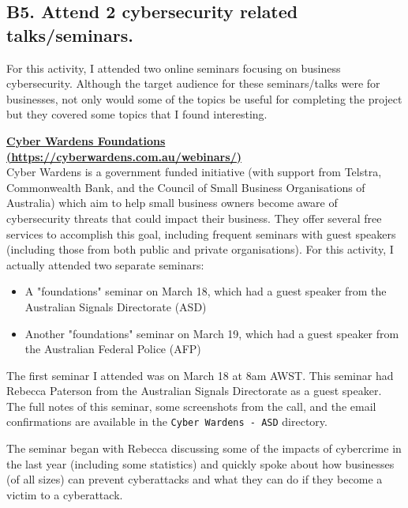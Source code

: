 \documentclass[titlepage]{article}
\begin{document}
    \newpage

    \subsection*{\centering B5. Attend 2 cybersecurity related talks/seminars.}
        For this activity, I attended two online seminars focusing on business
        cybersecurity. Although the target audience for these seminars/talks
        were for businesses, not only would some of the topics be useful for
        completing the project but they covered some topics that I found
        interesting.

        \bigskip

        \textbf{\href{https://cyberwardens.com.au/webinars/}{Cyber Wardens Foundations (https://cyberwardens.com.au/webinars/)}} \\
        Cyber Wardens is a government funded initiative (with support from
        Telstra, Commonwealth Bank, and the Council of Small Business
        Organisations of Australia) which aim to help small business owners
        become aware of cybersecurity threats that could impact their business.
        They offer several free services to accomplish this goal, including
        frequent seminars with guest speakers (including those from both public
        and private organisations). For this activity, I actually attended two
        separate seminars:
        \begin{itemize}
            \item A "foundations" seminar on March 18, which had a guest speaker from the Australian Signals Directorate (ASD) 
            \item Another "foundations" seminar on March 19, which had a guest speaker from the Australian Federal Police (AFP)
        \end{itemize}

        \vspace{0.5em}

        The first seminar I attended was on March 18 at 8am AWST. This seminar had Rebecca
        Paterson from the Australian Signals Directorate as a guest speaker. The
        full notes of this seminar, some screenshots from the call, and the
        email confirmations are available in the \texttt{Cyber Wardens - ASD}
        directory. 

        \vspace{0.5em}
        
        The seminar began with Rebecca discussing some of the impacts
        of cybercrime in the last year (including some statistics) and quickly
        spoke about how businesses (of all sizes) can prevent cyberattacks and
        what they can do if they become a victim to a cyberattack. 
        
\end{document}
